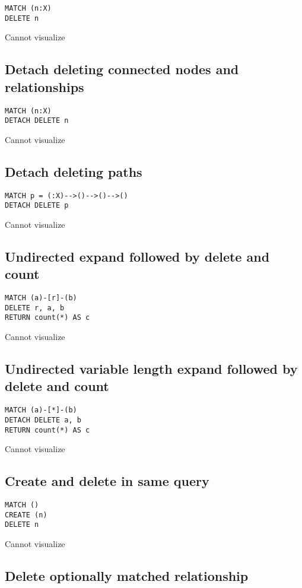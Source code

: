\begin{lstlisting}
MATCH (n:X)
DELETE n
\end{lstlisting}

Cannot visualize
\subsection{Detach deleting connected nodes and relationships}

\begin{lstlisting}
MATCH (n:X)
DETACH DELETE n
\end{lstlisting}

Cannot visualize
\subsection{Detach deleting paths}

\begin{lstlisting}
MATCH p = (:X)-->()-->()-->()
DETACH DELETE p
\end{lstlisting}

Cannot visualize
\subsection{Undirected expand followed by delete and count}

\begin{lstlisting}
MATCH (a)-[r]-(b)
DELETE r, a, b
RETURN count(*) AS c
\end{lstlisting}

Cannot visualize
\subsection{Undirected variable length expand followed by delete and count}

\begin{lstlisting}
MATCH (a)-[*]-(b)
DETACH DELETE a, b
RETURN count(*) AS c
\end{lstlisting}

Cannot visualize
\subsection{Create and delete in same query}

\begin{lstlisting}
MATCH ()
CREATE (n)
DELETE n
\end{lstlisting}

Cannot visualize
\subsection{Delete optionally matched relationship}

